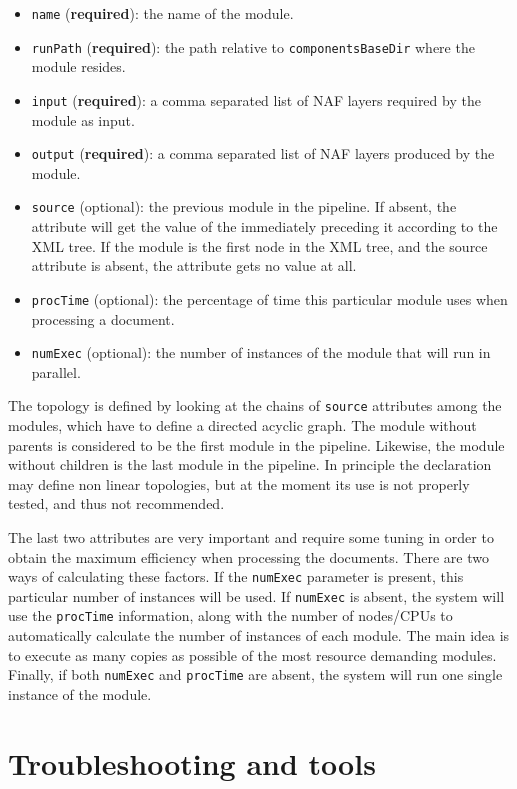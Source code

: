 \documentclass[a4]{article}
\begin{document}
\begin{itemize}
\item \texttt{name} (\textbf{required}): the name of the module.
\item \texttt{runPath} (\textbf{required}): the path relative to \texttt{componentsBaseDir}
  where the module resides.
\item \texttt{input} (\textbf{required}): a comma separated list of NAF layers required by the
  module as input.
\item \texttt{output} (\textbf{required}): a comma separated list of NAF layers produced by the
  module.
\item \texttt{source} (optional): the previous module in the pipeline. If
  absent, the attribute will get the value of the immediately preceding it
  according to the XML tree. If the module is the first node in the XML
  tree, and the source attribute is absent, the attribute gets no value at
  all.
\item \texttt{procTime} (optional): the percentage of time this particular
  module uses when processing a document.
\item \texttt{numExec} (optional): the number of instances of the module
  that will run in parallel.
\end{itemize}

The topology is defined by looking at the chains of \texttt{source}
attributes among the modules, which have to define a directed acyclic
graph. The module without parents is considered to be the first module in
the pipeline. Likewise, the module without children is the last module in
the pipeline. In principle the declaration may define non linear topologies,
but at the moment its use is not properly tested, and thus not recommended.

The last two attributes are very important and require some tuning in order
to obtain the maximum efficiency when processing the documents. There are
two ways of calculating these factors. If the \texttt{numExec} parameter is
present, this particular number of instances will be used. If
\texttt{numExec} is absent, the system will use the \texttt{procTime}
information, along with the number of nodes/CPUs to automatically calculate
the number of instances of each module. The main idea is to execute as many
copies as possible of the most resource demanding modules. Finally, if both
\texttt{numExec} and \texttt{procTime} are absent, the system will run one
single instance of the module.


\section{Troubleshooting and tools}
\label{sec:troubl-tools}
\end{document}
